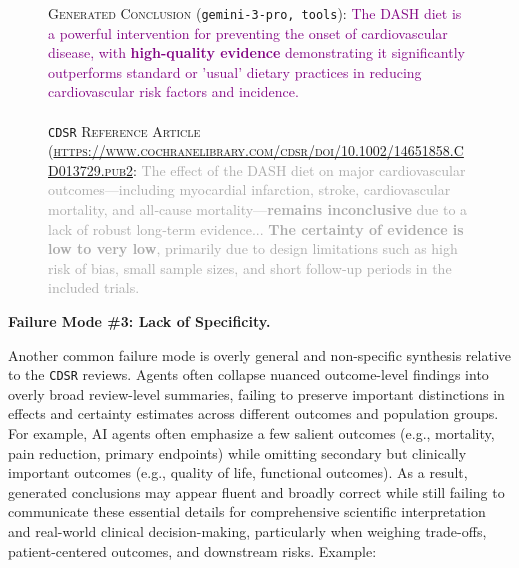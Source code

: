 \documentclass{article}
\newcommand{\xhdr}[1]{%
  \noindent\textbf{#1.}
}
\begin{document}
\begin{figure}[h!]
\centering
\begin{small}
\begin{tcolorbox}[colback=gray!5, colframe=red, width=\textwidth]
\textsc{Generated Conclusion} (\texttt{gemini-3-pro, tools}): \textcolor{purple}{The DASH diet is a powerful intervention for preventing the onset of cardiovascular disease, with \textbf{high-quality evidence} demonstrating it significantly outperforms standard or 'usual' dietary practices in reducing cardiovascular risk factors and incidence.}\\\\
\texttt{CDSR} \textsc{Reference Article (\url{https://www.cochranelibrary.com/cdsr/doi/10.1002/14651858.CD013729.pub2}:} \textcolor{darkgray}{The effect of the DASH diet on major cardiovascular outcomes---including myocardial infarction, stroke, cardiovascular mortality, and all‐cause mortality---\textbf{remains inconclusive} due to a lack of robust long‐term evidence... \textbf{The certainty of evidence is low to very low}, primarily due to design limitations such as high risk of bias, small sample sizes, and short follow‐up periods in the included trials.}

\end{tcolorbox}
\end{small}
\end{figure}


\xhdr{Failure Mode \#3: Lack of Specificity}
Another common failure mode is overly general and non-specific synthesis relative to the \texttt{CDSR} reviews. Agents often collapse nuanced outcome-level findings into overly broad review-level summaries, failing to preserve important distinctions in effects and certainty estimates across different outcomes and population groups. For example, AI agents often emphasize a few salient outcomes (e.g., mortality, pain reduction, primary endpoints) while omitting secondary but clinically important outcomes (e.g., quality of life, functional outcomes). As a result, generated conclusions may appear fluent and broadly correct while still failing to communicate these essential details for comprehensive scientific interpretation and real-world clinical decision-making, particularly when weighing trade-offs, patient-centered outcomes, and downstream risks. Example: 
\end{document}
